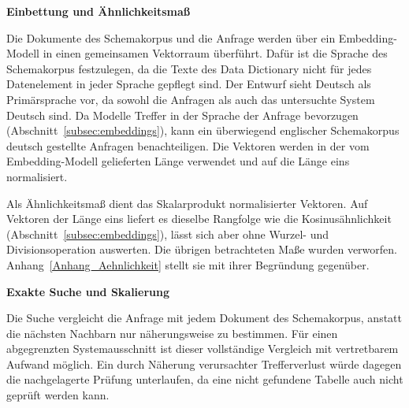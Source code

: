 \textbf{Einbettung und Ähnlichkeitsmaß}

Die Dokumente des Schemakorpus und die Anfrage werden über ein Embedding-Modell in einen gemeinsamen Vektorraum überführt. Dafür ist die Sprache des Schemakorpus festzulegen, da die Texte des Data Dictionary nicht für jedes Datenelement in jeder Sprache gepflegt sind. Der Entwurf sieht Deutsch als Primärsprache vor, da sowohl die Anfragen als auch das untersuchte System Deutsch sind. Da Modelle Treffer in der Sprache der Anfrage bevorzugen (Abschnitt~\ref{subsec:embeddings}), kann ein überwiegend englischer Schemakorpus deutsch gestellte Anfragen benachteiligen. Die Vektoren werden in der vom Embedding-Modell gelieferten Länge verwendet und auf die Länge eins normalisiert.

Als Ähnlichkeitsmaß dient das Skalarprodukt normalisierter Vektoren. Auf Vektoren der Länge eins liefert es dieselbe Rangfolge wie die Kosinusähnlichkeit (Abschnitt~\ref{subsec:embeddings}), lässt sich aber ohne Wurzel- und Divisionsoperation auswerten. Die übrigen betrachteten Maße wurden verworfen. Anhang~\ref{Anhang_Aehnlichkeit} stellt sie mit ihrer Begründung gegenüber.

\textbf{Exakte Suche und Skalierung}

Die Suche vergleicht die Anfrage mit jedem Dokument des Schemakorpus, anstatt die nächsten Nachbarn nur näherungsweise zu bestimmen. Für einen abgegrenzten Systemausschnitt ist dieser vollständige Vergleich mit vertretbarem Aufwand möglich. Ein durch Näherung verursachter Trefferverlust würde dagegen die nachgelagerte Prüfung unterlaufen, da eine nicht gefundene Tabelle auch nicht geprüft werden kann.

